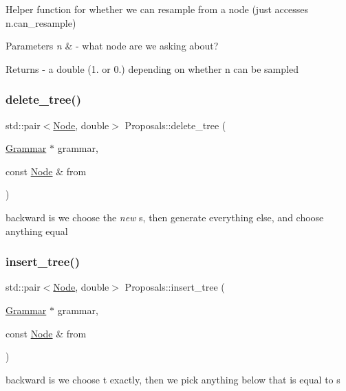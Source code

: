 Helper function for whether we can resample from a node (just accesses n.\+can\+\_\+resample) 
\begin{DoxyParams}{Parameters}
{\em n} & -\/ what node are we asking about? \\
\hline
\end{DoxyParams}
\begin{DoxyReturn}{Returns}
-\/ a double (1. or 0.) depending on whether n can be sampled
\end{DoxyReturn}
\mbox{\label{namespace_proposals_a5359114c687c89b35ba672b9d4b3c7ad}} 
\subsubsection{\texorpdfstring{delete\+\_\+tree()}{delete\_tree()}}
{\footnotesize\ttfamily std\+::pair$<$\hyperlink{class_node}{Node}, double$>$ Proposals\+::delete\+\_\+tree (\begin{DoxyParamCaption}\item[{\hyperlink{class_grammar}{Grammar} $\ast$}]{grammar,  }\item[{const \hyperlink{class_node}{Node} \&}]{from }\end{DoxyParamCaption})}

backward is we choose the {\itshape new} s, then generate everything else, and choose anything equal \mbox{\label{namespace_proposals_a7286635ba7407c6f47a6cde53b832741}} 
\subsubsection{\texorpdfstring{insert\+\_\+tree()}{insert\_tree()}}
{\footnotesize\ttfamily std\+::pair$<$\hyperlink{class_node}{Node}, double$>$ Proposals\+::insert\+\_\+tree (\begin{DoxyParamCaption}\item[{\hyperlink{class_grammar}{Grammar} $\ast$}]{grammar,  }\item[{const \hyperlink{class_node}{Node} \&}]{from }\end{DoxyParamCaption})}

backward is we choose t exactly, then we pick anything below that is equal to s \mbox{\label{namespace_proposals_a46b497d7c2d664181240aed4cc92ad73}} 
